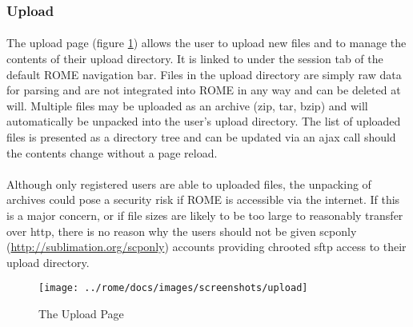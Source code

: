 \subsubsection{Upload}
\label{sec:view_upload}

\paragraph{}
The upload page (figure \ref{fig:upload_view}) allows the user to upload new files and to manage the contents of their upload directory. It is linked to under the session tab of the default ROME navigation bar. Files in the upload directory are simply raw data for parsing and are not integrated into ROME in any way and can be deleted at will. Multiple files may be uploaded as an archive (zip, tar, bzip) and will automatically be unpacked into the user's upload directory. The list of uploaded files is presented as a directory tree and can be updated via an ajax call should the contents change without a page reload. 

\paragraph{}
Although only registered users are able to uploaded files, the unpacking of archives could pose a security risk if ROME is accessible via the internet. If this is a major concern, or if file sizes are likely to be too large to reasonably transfer over http, there is no reason why the users should not be given scponly (\url{http://sublimation.org/scponly}) accounts providing chrooted sftp access to their upload directory. 


\begin{figure}[h]
\centering
\texttt{[image: ../rome/docs/images/screenshots/upload]}
\caption{The Upload Page}\label{fig:upload_view}
\end{figure}

\clearpage
